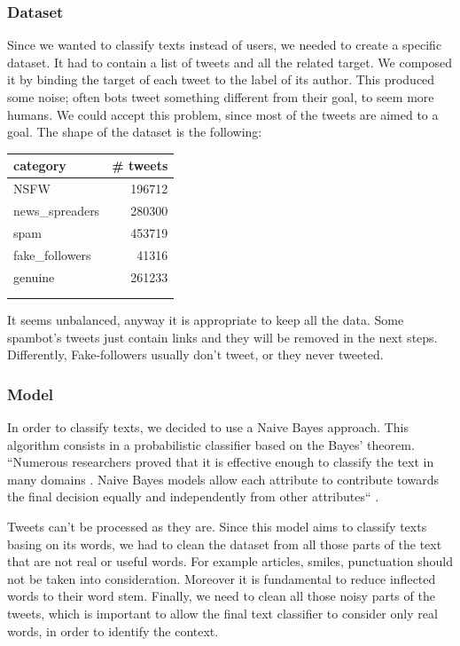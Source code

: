 \subsubsection{Dataset}
Since we wanted to classify texts instead of users, we needed to create a specific dataset.
It had to contain a list of tweets and all the related target. We composed it by binding the target of each tweet to the label of its author. This produced some noise; often bots tweet something different from their goal, to seem more humans. We could accept this problem, since most of the tweets are aimed to a goal.
The shape of the dataset is the following:

\begin{center}
	\begin{tabular}{lr}
		category&\# tweets\\
		\hline\hline
		NSFW&196712\\
		news\_spreaders&280300\\
		spam&453719\\
		fake\_followers&41316\\
		genuine&261233\\
		\hline\\\\
	\end{tabular}
\end{center}

It seems unbalanced, anyway it is appropriate to keep all the data. Some spambot's tweets just contain links and they will be removed in the next steps. Differently, Fake-followers usually don't tweet, or they never tweeted.

\subsubsection{Model}
In order to classify texts, we decided to use a Naive Bayes approach. This algorithm consists in a probabilistic classifier based on the Bayes' theorem. ``Numerous researchers proved that it is effective enough to classify the text in many domains \cite{svm}. Naive Bayes models allow each attribute to contribute towards the final decision equally and independently from other attributes`` \cite{nb}.

Tweets can't be processed as they are. Since this model aims to classify texts basing on its words, we had to clean the dataset from all those parts of the text that are not real or useful words. For example articles, smiles, punctuation should not be taken into consideration. Moreover it is fundamental to reduce inflected words to their word stem. Finally, we need to clean all those noisy parts of the tweets, which is important to allow the final text classifier to consider only real words, in order to identify the context.

